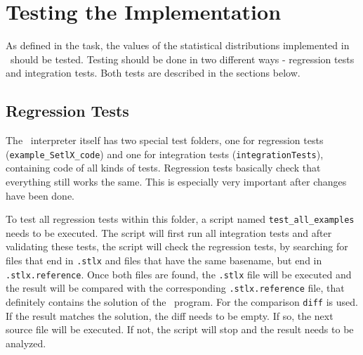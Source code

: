 
\chapter{Testing the Implementation}


	As defined in the task, the values of the statistical distributions implemented in \setlx\ should be tested. Testing should be done in two different ways - regression tests and integration tests. Both tests are described in the sections below.

	 




\section{Regression Tests}

	The \setlx\ interpreter itself has two special test folders, one for regression tests (\lstinline{example_SetlX_code}) and one for integration tests (\lstinline{integrationTests}), containing code of all kinds of tests. Regression tests basically check that everything still works the same. This is especially very important after changes have been done.

	To test all regression tests within this folder, a script named \lstinline{test_all_examples} needs to be executed. The script will first run all integration tests and after validating these tests, the script will check the regression tests, by searching for files that end in \lstinline{.stlx} and files that have the same basename, but end in \lstinline{.stlx.reference}. Once both files are found, the \lstinline{.stlx} file will be executed and the result will be compared with the corresponding \lstinline{.stlx.reference} file, that definitely contains the solution of the \setlx\ program. For the comparison \lstinline{diff} is used. If the result matches the solution, the diff needs to be empty. If so, the next source file will be executed. If not, the script will stop and the result needs to be analyzed.

